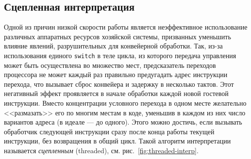 \subsection{Сцепленная интерпретация}

Одной из причин низкой скорости работы является неэффективное использование различных аппаратных ресурсов хозяйской системы, призванных уменьшить влияние явлений, разрушительных для конвейерной обработки. Так, из-за использования единого \texttt{switch} в теле цикла, из которого передача управления может быть осуществлена  во множество мест, предсказатель переходов процессора не может каждый раз правильно предугадать адрес инструкции перехода, что вызывает сброс конвейера и задержку в несколько тактов. Этот негативный эффект проявляется в начале обработки каждой новой гостевой инструкции. Вместо концентрации условного перехода в одном месте  желательно <<размазать>> его по многим местам в коде, уменьшив в каждом из них число вариантов адреса (в идеале --- до одного). Этого можно достичь, если вызывать обработчик следующей инструкции сразу после конца работы текущей инструкции, без возвращения в общий цикл. Такой алгоритм интерпретации называется \textit{сцепленным} (\abbr threaded), см. рис.~\ref{fig:threaded-interp}. 

